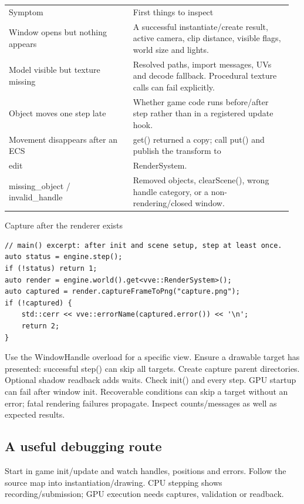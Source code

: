 \documentclass[11pt,a4paper]{article}
\begin{document}
{\small
\begin{longtable}{@{}p{0.42\linewidth}p{0.54\linewidth}@{}}
Symptom & First things to inspect \\
Window opens but nothing appears & A successful instantiate/create result, active camera, clip distance, visible flags, world size and lights. \\
Model visible but texture missing & Resolved paths, import messages, UVs and decode fallback. Procedural texture calls can fail explicitly. \\
Object moves one step late & Whether game code runs before/after step rather than in a registered update hook. \\
Movement disappears after an ECS & get() returned a copy; call put() and publish the transform to \\
edit & RenderSystem. \\
missing\_object / invalid\_handle & Removed objects, clearScene(), wrong handle category, or a non-rendering/closed window. \\
\end{longtable}
}

Capture after the renderer exists

\begin{lstlisting}[language={}]
// main() excerpt: after init and scene setup, step at least once.
auto status = engine.step();
if (!status) return 1;
auto render = engine.world().get<vve::RenderSystem>();
auto captured = render.captureFrameToPng("capture.png");
if (!captured) {
    std::cerr << vve::errorName(captured.error()) << '\n';
    return 2;
}
\end{lstlisting}

Use the WindowHandle overload for a specific view. Ensure a drawable target has presented: successful step() can skip all targets. Create capture parent directories. Optional shadow readback adds waits. Check init() and every step. GPU startup can fail after window init. Recoverable conditions can skip a target without an error; fatal rendering failures propagate. Inspect counts/messages as well as expected results.

\subsection*{A useful debugging route}
Start in game init/update and watch handles, positions and errors. Follow the source map into instantiation/drawing. CPU stepping shows recording/submission; GPU execution needs captures, validation or readback.
\end{document}
